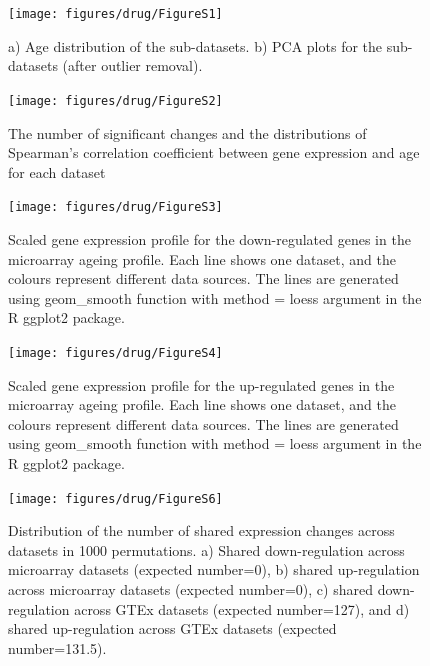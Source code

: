 \documentclass[12pt,twoside]{unicam}
\begin{document}
\begin{figure}

{\centering \texttt{[image: figures/drug/FigureS1]} 

}

\caption[Age distribution of individual datasets]{a) Age distribution of the sub-datasets. b) PCA plots for the sub-datasets (after outlier removal).}\label{fig:drugFigS1}
\end{figure}

\begin{figure}

{\centering \texttt{[image: figures/drug/FigureS2]} 

}

\caption{The number of significant changes and the distributions of Spearman's correlation coefficient between gene expression and age for each dataset}\label{fig:drugFigS2}
\end{figure}

\begin{figure}

{\centering \texttt{[image: figures/drug/FigureS3]} 

}

\caption[Gene expression profiles for the down-regulated genes in the ageing signature]{Scaled gene expression profile for the down-regulated genes in the microarray ageing profile. Each line shows one dataset, and the colours represent different data sources. The lines are generated using geom\_smooth function with method = loess argument in the R ggplot2 package.}\label{fig:drugFigS3}
\end{figure}

\begin{figure}

{\centering \texttt{[image: figures/drug/FigureS4]} 

}

\caption[Gene expression profiles for the up-regulated genes in the ageing signature]{Scaled gene expression profile for the up-regulated genes in the microarray ageing profile. Each line shows one dataset, and the colours represent different data sources. The lines are generated using geom\_smooth function with method = loess argument in the R ggplot2 package.}\label{fig:drugFigS4}
\end{figure}

\begin{figure}

{\centering \texttt{[image: figures/drug/FigureS6]} 

}

\caption[Distributions of the expected number of up- and down-regulated genes in the ageing signatures under null hypothesis]{Distribution of the number of shared expression changes across datasets in 1000 permutations. a) Shared down-regulation across microarray datasets (expected number=0), b) shared up-regulation across microarray datasets (expected number=0), c) shared down-regulation across GTEx datasets (expected number=127), and d) shared up-regulation across GTEx datasets (expected number=131.5).}\label{fig:drugFigS6}
\end{figure}
\end{document}
